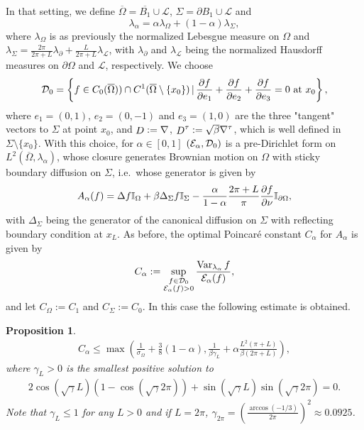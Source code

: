 \documentclass[a4paper]{article}
\newtheorem{proposition}[theorem]{Proposition}
\theoremstyle{definition}
\DeclareMathOperator{\Var}{Var}
\numberwithin{equation}{section}
\begin{document}
In that setting, we define $\overline \Omega = \overline{ B_1 }\cup \mathcal L $, $\Sigma = \partial B_1 \cup \mathcal L$ and 
\[
\lambda_\alpha = \alpha \lambda_\Omega + (1-\alpha) \lambda_\Sigma,\]
where $\lambda_\Omega$ is as previously the normalized Lebesgue measure on $\Omega$ and $\lambda_\Sigma=\frac{2 \pi}{2 \pi+L} \lambda_\partial + \frac{L}{2\pi +L} \lambda_\mathcal L$, with $\lambda_\partial$ and $\lambda_\mathcal L$ being the normalized Hausdorff measures on $\partial \Omega$ and $\mathcal L$, respectively. We choose \[
 \mathcal {D}_0 =\left\{ f \in C_0(\overline{\Omega})) \cap C^1(\overline \Omega \setminus \{x_0\} ) \,| \,   \frac{\partial f}{\partial e_1}+\frac{\partial f}{\partial e_2}+\frac{\partial f}{\partial e_3}= 0 \mbox{ at } x_0\right\},\]
 where $e_1=(0,1)$, $e_2=(0,-1)$ and $e_3=(1,0)$ are the three "tangent" vectors to $\Sigma$ at point $x_0$,
 and  $\mathop D := \nabla$, ${\mathop D}^\tau:=\sqrt{\beta}\nabla^\tau$, which is well defined  in $\Sigma \setminus \{x_0\}$. With this choice, for $\alpha \in [0,1]$ $(\mathcal E_\alpha, \mathcal {D}_0)$ is a pre-Dirichlet form on $L^2(\overline \Omega, \lambda_\alpha) $, whose closure generates Brownian motion on $\Omega$ with sticky boundary diffusion on $\Sigma$, i.e.\ whose generator is given by  \[A_\alpha(f) =  \Delta f \mathbb I_{\Omega} + \beta \Delta_\Sigma f\mathbb I_{\Sigma} -\frac{\alpha}{1-\alpha}\frac{2\pi+L}{\pi} \frac {\partial f}{\partial \nu }\mathbb I_{\partial \Omega },\]
with $\Delta_\Sigma$ being the generator of the canonical diffusion on $\Sigma$ with reflecting boundary condition at $x_L$. As before, the optimal Poincaré constant $C_\alpha$  for $A_\alpha$ is given by
\begin{align*}
C_\alpha:=\sup_{\substack {f \in \DomE_0 \\ \mathcal E_\alpha(f)>0}}  \frac{\Var_{\lambda_\alpha} f}{\mathcal E_\alpha (f)},
\end{align*}
and  let $C_\Omega:=C_1$ and $C_\Sigma:=C_0$.  In this case the following estimate is obtained.
\begin{proposition}
\label{prop:ball_needle}
\begin{align*}
    C_\alpha \leq \max \left( \frac{1}{\sigma_{\Omega}} + \frac{3}{8}(1-\alpha), \frac{1}{\beta\gamma_L} + \alpha \frac{L^2(\pi+L)}{\beta(2\pi + L)} \right),
\end{align*}
where $\gamma_L >0$ is the smallest positive solution to 
  \begin{align}
  \label{first eigenvalue needle}
 2 \cos (\sqrt{\gamma}L) (1- \cos (\sqrt{\gamma}2 \pi)) +\sin (\sqrt{\gamma}L)\sin (\sqrt{\gamma}2 \pi)=0.
 \end{align}
Note that $\gamma_L \leq 1$ for any $L>0$ and if  $L=2\pi$,  $\gamma_{2\pi}= \left(\frac{ \arccos(-1/3)}{2\pi}\right)^2 \approx 0.0925$. 
\end{proposition}
\end{document}

